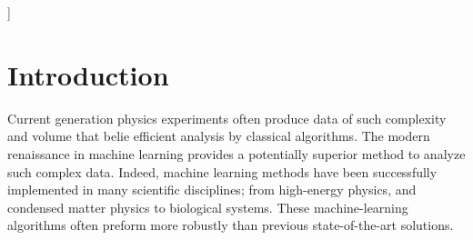 \documentclass[twoside,twocolumn,9pt]{article}
\begin{document}
]

\renewcommand*\rmdefault{bch}\normalfont\upshape
\rmfamily
\section*{}
\vspace{-1cm}









\section{Introduction}
Current generation physics experiments often produce data of such complexity and volume that belie efficient analysis by classical algorithms\cite{Adam-BourdariosHiggsMachineLearning2015,radovic_machine_2018}. The modern renaissance in machine learning\cite{dey_machine_2016,BishopPatternRecognitionMachine2006,Tanartificialintelligencerenaissance2018} provides a potentially superior method to analyze such complex data. Indeed, machine learning methods have been successfully implemented in many scientific disciplines; from  high-energy physics\cite{baldi_searching_2014,AlbertssonMachineLearningHigh2018}, and condensed matter physics\cite{deng_machine_2017,carrasquilla_machine_2017,beach_machine_2018,wang_machine_2017,walters_machine_2019} to biological systems\cite{tarca_machine_2007}. These machine-learning algorithms often preform more robustly than previous state-of-the-art solutions\cite{al-jarrah_efficient_2015}.
\end{document}
